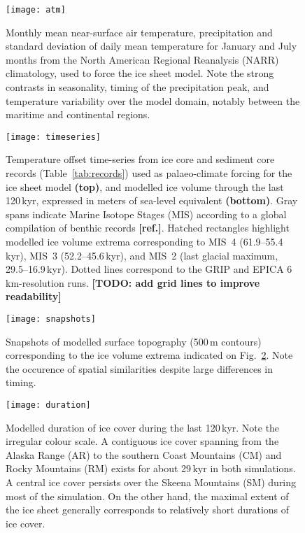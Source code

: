 \documentclass[tc, ms]{copernicus}
\newcommand{\todo}[1]{\textbf{[TODO: #1]}}
\newcommand{\aref}[0]{\textbf{[ref.]}}
\renewcommand{\citep}[1]{\aref}
\begin{document}
\begin{figure}
  \texttt{[image: atm]}
  \caption{Monthly mean near-surface air temperature, precipitation and
           standard deviation of daily mean temperature for January and July
           months from the North American Regional Reanalysis (NARR)
           climatology, used to force the ice sheet model. Note the
           strong contrasts in seasonality, timing of the precipitation peak,
           and temperature variability over the model domain, notably between
           the maritime and continental regions.}
  \label{fig:atm}
\end{figure}

\begin{figure}
  \texttt{[image: timeseries]}
  \caption{Temperature offset time-series from ice core and sediment core
           records (Table~\ref{tab:records}) used as palaeo-climate forcing for
           the ice sheet model \textbf{(top)}, and modelled ice volume
           through the last 120\,\unit{kyr}, expressed in meters of sea-level
           equivalent \textbf{(bottom)}. Gray spans indicate Marine Isotope
           Stages (MIS) according to a global compilation of benthic
            records \citep{lisiecki-raymo-2005}. Hatched
           rectangles highlight modelled ice volume extrema corresponding to
           MIS~4 (61.9--55.4\,\unit{kyr}), MIS~3 (52.2--45.6\,\unit{kyr}), and
           MIS~2 (last glacial maximum, 29.5--16.9\,\unit{kyr}). Dotted lines
           correspond to the GRIP and EPICA 6\,\unit{km}-resolution runs.
           \todo{add grid lines to improve readability}}
  \label{fig:timeseries}
\end{figure}

\begin{figure}
  \texttt{[image: snapshots]}
  \caption{Snapshots of modelled surface topography (500\,\unit{m} contours)
           corresponding to the ice volume extrema indicated on
           Fig.~\ref{fig:timeseries}. Note the occurence of spatial similarities
           despite large differences in timing.}
  \label{fig:snapshots}
\end{figure}

\begin{figure}
  \texttt{[image: duration]}
  \caption{Modelled duration of ice cover during the last 120\,\unit{kyr}.
           Note the irregular colour scale. A contiguous ice cover spanning
           from the Alaska Range (AR) to the southern Coast Mountains (CM) and
           Rocky Mountains (RM) exists for about 29\,\unit{kyr} in both
           simulations. A central
           ice cover persists over the Skeena Mountains (SM) during most of the
           simulation. On the other hand, the maximal extent of the ice sheet
           generally corresponds to relatively short durations of ice cover.}
  \label{fig:duration}
\end{figure}
\end{document}

